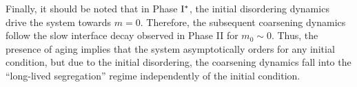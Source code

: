 Finally, it should be noted that in Phase ${\rm I}^{*}$, the initial disordering dynamics drive the system towards $m=0$. Therefore, the subsequent coarsening dynamics follow the slow interface decay observed in Phase II for $m_0 \sim 0$. Thus, the presence of aging implies that the system asymptotically orders for any initial condition, but due to the initial disordering, the coarsening dynamics fall into the ``long-lived segregation'' regime independently of the initial condition. 



